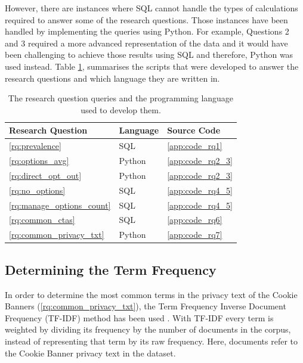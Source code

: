 \documentclass[../main.tex]{subfiles}
\begin{document}
However, there are instances where SQL cannot handle the types of calculations required to answer some of the research questions. Those instances have been handled by implementing the queries using Python. For example, Questions 2 and 3 required a more advanced representation of the data and it would have been challenging to achieve those results using SQL and therefore, Python was used instead. Table \ref{tab:impl_rqs_sc}, summarises the scripts that were developed to answer the research questions and which language they are written in. 

\begin{table}[ht]
    \centering
    \begin{tabular}{@{}lll@{}}
    \toprule
        \textbf{Research Question}      & \textbf{Language} & \textbf{Source Code}  \\ \midrule
        \ref{rq:prevalence}             & SQL               & \ref{app:code_rq1}    \\
        \ref{rq:options_avg}            & Python            & \ref{app:code_rq2_3}    \\
        \ref{rq:direct_opt_out}         & Python            & \ref{app:code_rq2_3}    \\
        \ref{rq:no_options}             & SQL               & \ref{app:code_rq4_5}    \\
        \ref{rq:manage_options_count}   & SQL               & \ref{app:code_rq4_5}    \\
        \ref{rq:common_ctas}            & SQL               & \ref{app:code_rq6}    \\
        \ref{rq:common_privacy_txt}     & Python            & \ref{app:code_rq7}    \\ \bottomrule
    \end{tabular}
    \caption{The research question queries and the programming language used to develop them.}
    \label{tab:impl_rqs_sc}
\end{table}

\subsection{Determining the Term Frequency}
In order to determine the most common terms in the privacy text of the Cookie Banners (\ref{rq:common_privacy_txt}), the Term Frequency Inverse Document Frequency (TF-IDF) method has been used \cite{jones1972statistical, ramos2003using}. With TF-IDF every term is weighted by dividing its frequency by the number of documents in the corpus, instead of representing that term by its raw frequency. Here, documents refer to the Cookie Banner privacy text in the dataset.
\end{document}
